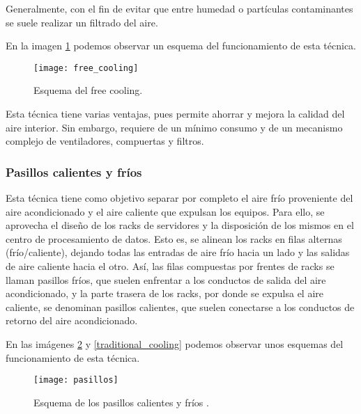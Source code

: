 
Generalmente, con el fin de evitar que entre humedad o partículas contaminantes se suele realizar un filtrado del aire.

En la imagen \ref{free_coling} podemos observar un esquema del funcionamiento de esta técnica.

\begin{figure}
    \begin{center}
        \label{free_coling}
        \texttt{[image: free\_cooling]}
        \caption{Esquema del free cooling.}
    \end{center}
\end{figure}

Esta técnica tiene varias ventajas, pues permite ahorrar y mejora la calidad del aire interior. Sin embargo, requiere de un mínimo consumo y de un mecanismo complejo de ventiladores, compuertas y filtros.

\subsubsection{Pasillos calientes y fríos}

Esta técnica tiene como objetivo separar por completo el aire frío proveniente del aire acondicionado y el aire caliente que expulsan los equipos. Para ello, se aprovecha el diseño de los racks de servidores y la disposición de los mismos en el centro de procesamiento de datos. Esto es, se alinean los racks en filas alternas (frío/caliente), dejando todas las entradas de aire frío hacia un lado y las salidas de aire caliente hacia el otro. Así, las filas compuestas por frentes de racks se llaman pasillos fríos, que suelen enfrentar a los conductos de salida del aire acondicionado, y la parte trasera de los racks, por donde se expulsa el aire caliente, se denominan pasillos calientes, que suelen conectarse a los conductos de retorno del aire acondicionado.

En las imágenes \ref{pasillos} y \ref{traditional_cooling} podemos observar unos esquemas del funcionamiento de esta técnica.

\begin{figure}
    \begin{center}
        \label{pasillos}
        \texttt{[image: pasillos]}
        \caption{Esquema de los pasillos calientes y fríos \cite{Kelvion}.}
    \end{center}
\end{figure}


